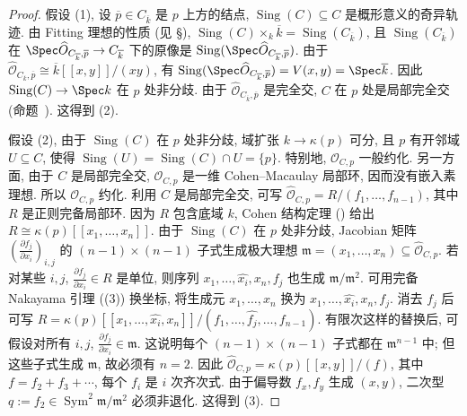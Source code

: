 \begin{proof}
假设 (1), 设 $\overline p\in C_{\overline k}$ 是 $p$ 上方的结点, $\operatorname{Sing}(C)\subseteq C$ 是概形意义的奇异轨迹. 由 Fitting 理想的性质 (见 \S{}), $\operatorname{Sing}(C)\times_k\overline k=\operatorname{Sing}(C_{\overline k})$, 且 $\operatorname{Sing}(C_{\overline k})$ 在 $\Spec\widehat{\mathcal O}_{C_{\overline k},\allowbreak \overline p}\to\allowbreak C_{\overline k}$ 下的原像是 $\operatorname{Sing}(\Spec\widehat{\mathcal O}_{C_{\overline k},\allowbreak \overline p})$. 由于 $\widehat{\mathcal O}_{C_{\overline k},\allowbreak \overline p}\cong\overline k[[x,\allowbreak y]]/(xy)$, 有 $\operatorname{Sing}(\Spec\widehat{\mathcal O}_{C_{\overline k},\allowbreak \overline p})=V(x,\allowbreak y)=\Spec\overline k$. 因此 $\operatorname{Sing}(C)\to\Spec k$ 在 $p$ 处非分歧. 由于 $\widehat{\mathcal O}_{C_{\overline k},\allowbreak \overline p}$ 是完全交, $C$ 在 $p$ 处是局部完全交 (命题~). 这得到 (2).

假设 (2), 由于 $\operatorname{Sing}(C)$ 在 $p$ 处非分歧, 域扩张 $k\to\kappa(p)$ 可分, 且 $p$ 有开邻域 $U\subseteq C$, 使得 $\operatorname{Sing}(U)=\operatorname{Sing}(C)\cap U=\{p\}$. 特别地, $\mathcal O_{C,\allowbreak p}$ 一般约化. 另一方面, 由于 $C$ 是局部完全交, $\mathcal O_{C,\allowbreak p}$ 是一维 Cohen--Macaulay 局部环, 因而没有嵌入素理想. 所以 $\mathcal O_{C,\allowbreak p}$ 约化. 利用 $C$ 是局部完全交, 可写 $\widehat{\mathcal O}_{C,\allowbreak p}=R/(f_1,\allowbreak \ldots,\allowbreak f_{n-1})$, 其中 $R$ 是正则完备局部环. 因为 $R$ 包含底域 $k$, Cohen 结构定理 () 给出 $R\cong\kappa(p)[[x_1,\allowbreak \ldots,\allowbreak x_n]]$. 由于 $\operatorname{Sing}(C)$ 在 $p$ 处非分歧, Jacobian 矩阵 $(\frac{\partial f_j}{\partial x_i})_{i,\allowbreak j}$ 的 $(n-1)\times(n-1)$ 子式生成极大理想 $\mathfrak m=(x_1,\allowbreak \ldots,\allowbreak x_n)\subseteq\widehat{\mathcal O}_{C,\allowbreak p}$. 若对某些 $i,\allowbreak j$, $\frac{\partial f_j}{\partial x_i}\in R$ 是单位, 则序列 $x_1,\allowbreak \ldots,\allowbreak \widehat{x_i},\allowbreak x_n,\allowbreak f_j$ 也生成 $\mathfrak m/\mathfrak m^2$. 可用完备 Nakayama 引理 ((3)) 换坐标, 将生成元 $x_1,\allowbreak \ldots,\allowbreak x_n$ 换为 $x_1,\allowbreak \ldots,\allowbreak \widehat{x_i},\allowbreak x_n,\allowbreak f_j$. 消去 $f_j$ 后可写 $R=\kappa(p)[[x_1,\allowbreak \ldots,\allowbreak \widehat{x_i},\allowbreak x_n]]/(f_1,\allowbreak \ldots,\allowbreak \widehat{f_j},\allowbreak \ldots,\allowbreak f_{n-1})$. 有限次这样的替换后, 可假设对所有 $i,\allowbreak j$, $\frac{\partial f_j}{\partial x_i}\in\mathfrak m$. 这说明每个 $(n-1)\times(n-1)$ 子式都在 $\mathfrak m^{n-1}$ 中; 但这些子式生成 $\mathfrak m$, 故必须有 $n=2$. 因此 $\widehat{\mathcal O}_{C,\allowbreak p}=\kappa(p)[[x,\allowbreak y]]/(f)$, 其中 $f=f_2+f_3+\cdots$, 每个 $f_i$ 是 $i$ 次齐次式. 由于偏导数 $f_x,\allowbreak f_y$ 生成 $(x,\allowbreak y)$, 二次型 $q:=f_2\in\operatorname{Sym}^2\mathfrak m/\mathfrak m^2$ 必须非退化. 这得到 (3).


\end{proof}
